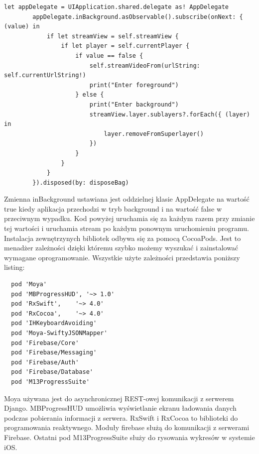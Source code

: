 \begin{verbatim}
let appDelegate = UIApplication.shared.delegate as! AppDelegate
        appDelegate.inBackground.asObservable().subscribe(onNext: { (value) in
            if let streamView = self.streamView {
                if let player = self.currentPlayer {
                    if value == false {
                        self.streamVideoFrom(urlString: self.currentUrlString!)
                        print("Enter foreground")
                    } else {
                        print("Enter background")
                        streamView.layer.sublayers?.forEach({ (layer) in
                            layer.removeFromSuperlayer()
                        })
                    }
                }
            }
        }).disposed(by: disposeBag)
\end{verbatim}
Zmienna inBackground ustawiana jest oddzielnej klasie AppDelegate na wartość true kiedy aplikacja przechodzi w tryb background i na wartość false w przeciwnym wypadku. Kod powyżej uruchamia się za każdym razem przy zmianie tej wartości i uruchamia stream po każdym ponownym uruchomieniu programu.
Instalacja zewnętrzynych bibliotek odbywa się za pomocą CocoaPods. Jest to menadżer zależności dzięki któremu szybko możemy wyszukać i zainstalować wymagane oprogramowanie. Wszystkie użyte zależności przedstawia poniższy listing: 

\begin{verbatim}
  pod 'Moya'
  pod 'MBProgressHUD', '~> 1.0'
  pod 'RxSwift',    '~> 4.0'
  pod 'RxCocoa',    '~> 4.0'
  pod 'IHKeyboardAvoiding'
  pod 'Moya-SwiftyJSONMapper'
  pod 'Firebase/Core'
  pod 'Firebase/Messaging'
  pod 'Firebase/Auth'
  pod 'Firebase/Database'
  pod 'M13ProgressSuite'
\end{verbatim}
Moya używana jest do asynchronicznej REST-owej komunikacji z serwerem Django. MBProgressHUD umożliwia wyświetlanie ekranu ładowania danych podczas pobierania informacji z serwera. RxSwift i RxCocoa to biblioteki do programowania reaktywnego. Moduły firebase służą do komunikacji z serwerami Firebase. Ostatni pod M13ProgressSuite służy do rysowania wykresów w systemie iOS.

